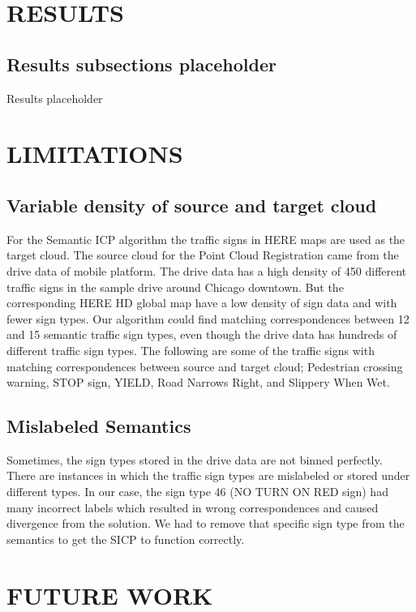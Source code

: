 \documentclass[letterpaper, 10 pt, conference]{ieeeconf}  %
\begin{document}
\section{RESULTS}


\subsection{Results subsections placeholder} 


Results placeholder


\section{LIMITATIONS}

\subsection{Variable density of source and target cloud}


For the Semantic ICP algorithm the traffic signs in HERE maps are used as the target cloud. The source cloud for the Point Cloud Registration came from the drive data of mobile platform. The drive data has a high density of 450 different traffic signs in the sample drive around Chicago downtown. But the corresponding HERE HD global map have a low density of sign data and with fewer sign types. Our algorithm could find matching correspondences between 12 and 15 semantic traffic sign types, even though the drive data has hundreds of different traffic sign types. The following are some of the traffic signs with matching correspondences between source and target cloud; Pedestrian crossing warning, STOP sign, YIELD, Road Narrows Right, and Slippery When Wet.
\subsection{Mislabeled Semantics}

Sometimes, the sign types stored in the drive data are not binned perfectly. There are instances in which the traffic sign types are mislabeled or stored under different types. In our case, the sign type 46 (NO TURN ON RED sign) had many incorrect labels which resulted in wrong correspondences and caused divergence from the solution. We had to remove that specific sign type from the semantics to get the SICP to function correctly.



\section{FUTURE WORK}
\end{document}
